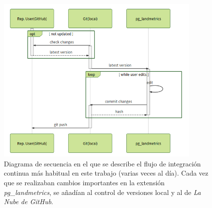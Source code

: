 \begin{itemize}
\begin{figure}
\begin{center}
\includegraphics[width=0.9\textwidth]{Metodologia/Figs/diary.png}
\caption{Diagrama de secuencia en el que se describe el flujo de integración continua más habitual en este trabajo (varias veces al día). Cada vez que se realizaban cambios importantes en la extensión \textit{pg\_landmetrics}, se añadían al control de versiones local y al de \textit{La Nube de GitHub}. \label{fig:diary}}
\end{center}
\end{figure}


\end{itemize}
